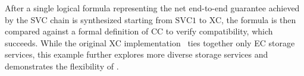 After a single logical formula representing the net end-to-end guarantee
achieved by the SVC chain is synthesized starting from $\text{SVC}1$
to XC, the formula is then compared against a formal definition of CC
to verify compatibility, which succeeds. While
the original XC implementation~\cite{boltoncc} ties together only EC
storage services, this example further explores more diverse storage
services and demonstrates the flexibility of \sysname{}.
%
%
%
%
%
%
